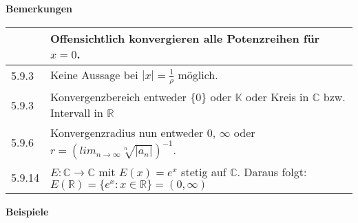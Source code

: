 \begin{longtable}{p{1cm} p{16cm}}
        \bottomrule
    \end{longtable}
    

    \noindent
    \textbf{Bemerkungen}
    
    \begin{longtable}{p{1cm} p{16cm}}
        \toprule

              & Offensichtlich konvergieren alle Potenzreihen für $x = 0$. \\
        \midrule
        5.9.3 & Keine Aussage bei $|x|=\frac{1}{\rho}$ möglich. \\
        \midrule
        5.9.3 & Konvergenzbereich entweder $\{0\}$ oder $\mathbb{K}$ oder Kreis in $\mathbb{C}$ bzw. Intervall in $\mathbb{R}$ \\
        \midrule
        5.9.6 & Konvergenzradius nun entweder $0$, $\infty$ oder $r = (lim_{n \rightarrow \infty} \sqrt[n]{|a_n|})^{-1}$. \\
        \midrule
        5.9.14& $E: \mathbb{C} \rightarrow \mathbb{C}$ mit $E(x) = e^x$ stetig auf $\mathbb{C}$. \hfill \break
                Daraus folgt: $E(\mathbb{R}) = \{e^x: x \in \mathbb{R}\} = (0, \infty)$ \\ 

        \bottomrule
    \end{longtable}
    

    

    \noindent
    \textbf{Beispiele}
    
